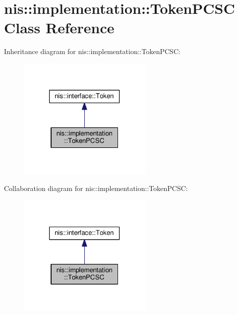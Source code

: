 \hypertarget{classnis_1_1implementation_1_1TokenPCSC}{\section{nis\-:\-:implementation\-:\-:Token\-P\-C\-S\-C Class Reference}
\label{classnis_1_1implementation_1_1TokenPCSC}
}


Inheritance diagram for nis\-:\-:implementation\-:\-:Token\-P\-C\-S\-C\-:
\nopagebreak
\begin{figure}[H]
\begin{center}
\leavevmode
\includegraphics[width=184pt]{classnis_1_1implementation_1_1TokenPCSC__inherit__graph}
\end{center}
\end{figure}


Collaboration diagram for nis\-:\-:implementation\-:\-:Token\-P\-C\-S\-C\-:
\nopagebreak
\begin{figure}[H]
\begin{center}
\leavevmode
\includegraphics[width=184pt]{classnis_1_1implementation_1_1TokenPCSC__coll__graph}
\end{center}
\end{figure}
